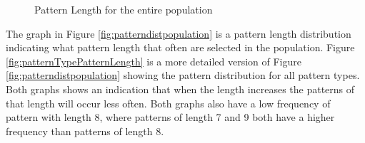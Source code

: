     \begin{figure}[H]
      \centering
      \caption{Pattern Length for the entire population}
      \label{fig:patternlengthpopulation}
    \end{figure}

    \clearpage

    The graph in Figure \ref{fig:patterndistpopulation} is a pattern length distribution indicating what pattern length that often are selected in the population. Figure \ref{fig:patternTypePatternLength} is a more detailed version of Figure \ref{fig:patterndistpopulation} showing the pattern distribution for all pattern types. Both graphs shows an indication that when the length increases the patterns of that length will occur less often. Both graphs also have a low frequency of pattern with length 8, where patterns of length 7 and 9 both have a higher frequency than patterns of length 8.

